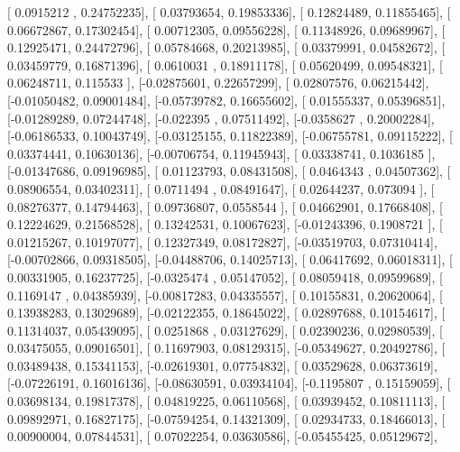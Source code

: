 \documentclass{article}
\begin{document}
       [ 0.0915212 ,  0.24752235],
       [ 0.03793654,  0.19853336],
       [ 0.12824489,  0.11855465],
       [ 0.06672867,  0.17302454],
       [ 0.00712305,  0.09556228],
       [ 0.11348926,  0.09689967],
       [ 0.12925471,  0.24472796],
       [ 0.05784668,  0.20213985],
       [ 0.03379991,  0.04582672],
       [ 0.03459779,  0.16871396],
       [ 0.0610031 ,  0.18911178],
       [ 0.05620499,  0.09548321],
       [ 0.06248711,  0.115533  ],
       [-0.02875601,  0.22657299],
       [ 0.02807576,  0.06215442],
       [-0.01050482,  0.09001484],
       [-0.05739782,  0.16655602],
       [ 0.01555337,  0.05396851],
       [-0.01289289,  0.07244748],
       [-0.022395  ,  0.07511492],
       [-0.0358627 ,  0.20002284],
       [-0.06186533,  0.10043749],
       [-0.03125155,  0.11822389],
       [-0.06755781,  0.09115222],
       [ 0.03374441,  0.10630136],
       [-0.00706754,  0.11945943],
       [ 0.03338741,  0.1036185 ],
       [-0.01347686,  0.09196985],
       [ 0.01123793,  0.08431508],
       [ 0.0464343 ,  0.04507362],
       [ 0.08906554,  0.03402311],
       [ 0.0711494 ,  0.08491647],
       [ 0.02644237,  0.073094  ],
       [ 0.08276377,  0.14794463],
       [ 0.09736807,  0.0558544 ],
       [ 0.04662901,  0.17668408],
       [ 0.12224629,  0.21568528],
       [ 0.13242531,  0.10067623],
       [-0.01243396,  0.1908721 ],
       [ 0.01215267,  0.10197077],
       [ 0.12327349,  0.08172827],
       [-0.03519703,  0.07310414],
       [-0.00702866,  0.09318505],
       [-0.04488706,  0.14025713],
       [ 0.06417692,  0.06018311],
       [ 0.00331905,  0.16237725],
       [-0.0325474 ,  0.05147052],
       [ 0.08059418,  0.09599689],
       [ 0.1169147 ,  0.04385939],
       [-0.00817283,  0.04335557],
       [ 0.10155831,  0.20620064],
       [ 0.13938283,  0.13029689],
       [-0.02122355,  0.18645022],
       [ 0.02897688,  0.10154617],
       [ 0.11314037,  0.05439095],
       [ 0.0251868 ,  0.03127629],
       [ 0.02390236,  0.02980539],
       [ 0.03475055,  0.09016501],
       [ 0.11697903,  0.08129315],
       [-0.05349627,  0.20492786],
       [ 0.03489438,  0.15341153],
       [-0.02619301,  0.07754832],
       [ 0.03529628,  0.06373619],
       [-0.07226191,  0.16016136],
       [-0.08630591,  0.03934104],
       [-0.1195807 ,  0.15159059],
       [ 0.03698134,  0.19817378],
       [ 0.04819225,  0.06110568],
       [ 0.03939452,  0.10811113],
       [ 0.09892971,  0.16827175],
       [-0.07594254,  0.14321309],
       [ 0.02934733,  0.18466013],
       [ 0.00900004,  0.07844531],
       [ 0.07022254,  0.03630586],
       [-0.05455425,  0.05129672],
\end{document}

